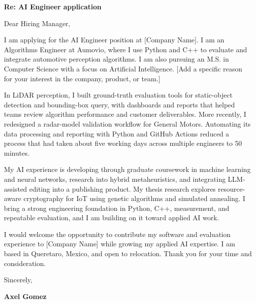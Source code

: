 


\textbf{Re: AI Engineer application}

Dear Hiring Manager,

I am applying for the AI Engineer position at [Company Name]. I am an Algorithms Engineer at Aumovio, where I use Python and C++ to evaluate and integrate automotive perception algorithms. I am also pursuing an M.S. in Computer Science with a focus on Artificial Intelligence. [Add a specific reason for your interest in the company, product, or team.]

In LiDAR perception, I built ground-truth evaluation tools for static-object detection and bounding-box query, with dashboards and reports that helped teams review algorithm performance and customer deliverables. More recently, I redesigned a radar-model validation workflow for General Motors. Automating its data processing and reporting with Python and GitHub Actions reduced a process that had taken about five working days across multiple engineers to 50 minutes.

My AI experience is developing through graduate coursework in machine learning and neural networks, research into hybrid metaheuristics, and integrating LLM-assisted editing into a publishing product. My thesis research explores resource-aware cryptography for IoT using genetic algorithms and simulated annealing. I bring a strong engineering foundation in Python, C++, measurement, and repeatable evaluation, and I am building on it toward applied AI work.

I would welcome the opportunity to contribute my software and evaluation experience to [Company Name] while growing my applied AI expertise. I am based in Queretaro, Mexico, and open to relocation. Thank you for your time and consideration.

\vspace{12pt}
Sincerely,

\vspace{8pt}
\textbf{Axel Gomez}
